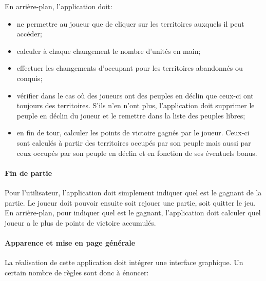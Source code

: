 \documentclass[a4paper, 11pt]{article}
\begin{document}
			En arrière-plan, l'application doit:
			\begin{itemize}
				\item ne permettre au joueur que de cliquer sur les territoires auxquels il peut accéder;
				\item calculer à chaque changement le nombre d'unités en main;
				\item effectuer les changements d'occupant pour les territoires abandonnés ou conquis;
				\item vérifier dans le cas où des joueurs ont des peuples en déclin que ceux-ci ont toujours des territoires. S'ils n'en n'ont plus, l'application doit supprimer le peuple en déclin du joueur et le remettre dans la liste des peuples libres;
				\item en fin de tour, calculer les points de victoire gagnés par le joueur. Ceux-ci sont calculés à partir des territoires occupés par son peuple mais aussi par ceux occupés par son peuple en déclin et en fonction de ses éventuels bonus.
			\end{itemize}
			
			\paragraph{Fin de partie\\}
			
			Pour l'utilisateur, l'application doit simplement indiquer quel est le gagnant de la partie. Le joueur doit pouvoir ensuite soit rejouer une partie, soit quitter le jeu. \\
			En arrière-plan, pour indiquer quel est le gagnant, l'application doit calculer quel joueur a le plus de points de victoire accumulés.
		
			\paragraph{Apparence et mise en page générale\\}
			
			La réalisation de cette application doit intégrer une interface graphique. Un certain nombre de règles sont donc à énoncer:\\
			
\end{document}
